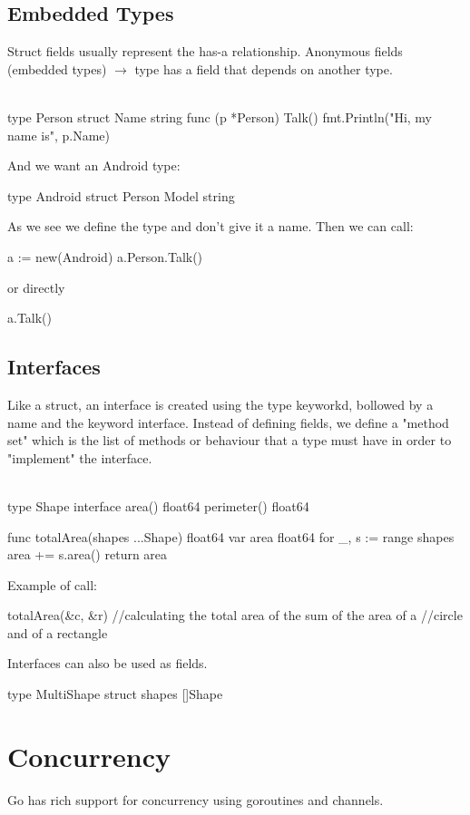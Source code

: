 \documentclass[twoside,a4paper,english]{report}
\begin{document}
\section{Embedded Types}
Struct fields usually represent the has-a relationship. Anonymous fields (embedded types) $\rightarrow$ type has a field that depends on another type.\\\\
\begin{go}
type Person struct {
  Name string
}
func (p *Person) Talk() {
  fmt.Println("Hi, my name is", p.Name)
}
\end{go}
And we want an Android type:
\begin{go}
type Android struct {
  Person
  Model string
}
\end{go}
As we see we define the type and don't give it a name. Then we can call:
\begin{go}
a := new(Android)
a.Person.Talk()
\end{go}
or directly
\begin{go}
a.Talk()
\end{go}
\section{Interfaces}
Like a struct, an interface is created using the type keyworkd, bollowed by a name and the keyword interface. Instead of defining fields, we define a "method set" which is the list of methods or behaviour that a type must have in order to "implement" the interface.\\\\
\begin{go}
type Shape interface {
  area() float64
  perimeter() float64
}   

func totalArea(shapes ...Shape) float64 {
  var area float64
  for _, s := range shapes {
      area += s.area()
  }
  return area
}
\end{go} 
Example of call:
\begin{go} 
totalArea(&c, &r) //calculating the total area of the sum of the area of a 
                  //circle and of a rectangle
\end{go}                  
Interfaces can also be used as fields.
\begin{go}
type MultiShape struct{
  shapes []Shape
}   
\end{go}
\chapter{Concurrency}
Go has rich support for concurrency using goroutines and channels.\\
\end{document}
